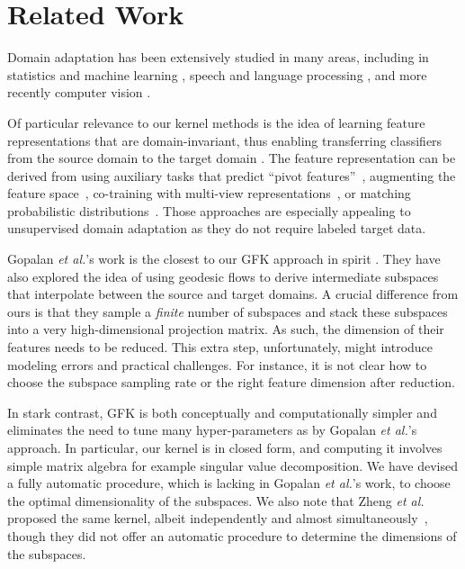 \section{Related Work}
\label{sRelated}

Domain adaptation has been extensively studied  in many areas, including in
statistics and machine learning \cite{shimodaira00shift,huang07correcting,bendavid07domain,pan2009survey},
speech and language
processing \cite{daume07easy,BlitzerEMNLP06Domain,LeggetterCSL95Maximum},
and more recently computer
vision \cite{bergamo09weak,gopalan2011domain,saenko2010adapting,kulisyou}.

Of particular relevance to our kernel methods  is the idea of learning feature representations that are domain-invariant, thus enabling transferring classifiers from the source domain to the target domain \cite{bendavid07domain,BlitzerEMNLP06Domain,BlitzerACL07domain,daume07easy,tca}.
The feature representation can be derived from using auxiliary tasks that predict ``pivot features''~\cite{ando05,BlitzerEMNLP06Domain}, augmenting the feature space~\cite{daume07easy,daume10co,li2012discriminative,gopalan2013learning}, co-training with multi-view representations~\cite{chen11cotrain}, or matching probabilistic distributions~\cite{tca}.
Those approaches are especially appealing to unsupervised domain adaptation as they  do not require labeled target data. %

Gopalan \emph{et al.}'s work is the closest to our GFK approach in spirit \cite{gopalan2011domain}. They have also explored the idea of using geodesic flows to derive intermediate subspaces that interpolate between the source and target domains. A crucial difference from ours is that they sample a \emph{finite} number of subspaces and stack these subspaces into a very high-dimensional projection matrix. As such, the dimension of their features needs to be reduced. This extra step, unfortunately, might introduce modeling errors and practical challenges. For instance, it is not clear how to choose the subspace sampling rate or the right feature dimension after reduction. %

In stark contrast, GFK is both conceptually and computationally simpler and eliminates the need to tune many hyper-parameters as by Gopalan \emph{et al.}'s approach. In particular, our kernel is in closed form, and computing it involves simple matrix algebra for example singular value decomposition. We have devised a fully automatic procedure, which is lacking in Gopalan \emph{et al.}'s work,  to choose the optimal dimensionality of the subspaces. {We also note that Zheng {\it et al.} proposed the same kernel, albeit independently and almost simultaneously~\cite{zheng2012grassmann}, though they did not offer an automatic procedure to determine the dimensions of the subspaces.}


